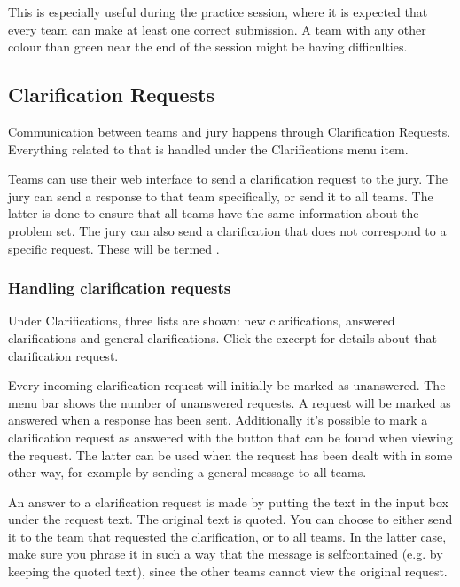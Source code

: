 \documentclass[a4paper,10pt,english,openany]{sphinxmanual}
\begin{document}
\sphinxAtStartPar
This is especially useful during the practice session, where it is
expected that every team can make at least one correct submission. A
team with any other colour than green near the end of the session
might be having difficulties.


\subsection{Clarification Requests}
\label{\detokenize{running:clarification-requests}}\label{\detokenize{running:clarifications}}
\sphinxAtStartPar
Communication between teams and jury happens through Clarification
Requests. Everything related to that is handled under the
Clarifications menu item.

\sphinxAtStartPar
Teams can use their web interface to send a clarification request to
the jury. The jury can send a response to that team specifically, or
send it to all teams. The latter is done to ensure that all teams have
the same information about the problem set. The jury can also send a
clarification that does not correspond to a specific request. These
will be termed .


\subsubsection{Handling clarification requests}
\label{\detokenize{running:handling-clarification-requests}}
\sphinxAtStartPar
Under Clarifications, three lists are shown: new clarifications,
answered clarifications and general clarifications. Click the excerpt
for details about that clarification request.

\sphinxAtStartPar
Every incoming clarification request will initially be marked as
unanswered. The menu bar shows the number of unanswered requests. A
request will be marked as answered when a response has been sent.
Additionally it’s possible to mark a clarification request as answered
with the button that can be found when viewing the request. The latter
can be used when the request has been dealt with in some other way,
for example by sending a general message to all teams.

\sphinxAtStartPar
An answer to a clarification request is made by putting the text in the
input box under the request text. The original text is quoted. You can
choose to either send it to the team that requested the clarification,
or to all teams. In the latter case, make sure you phrase it in such a
way that the message is self\sphinxhyphen{}contained (e.g. by keeping the quoted
text), since the other teams cannot view the original request.
\end{document}
